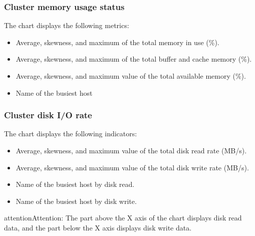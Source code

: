 \documentclass[letterpaper,10pt,english]{sphinxmanual}
\begin{document}
\subsubsection{Cluster memory usage status}
\label{\detokenize{manage-system/web-platform-monitoring/web-platform-view-cluster-status:cluster-memory-usage-status}}
\sphinxAtStartPar
The chart displays the following metrics:
\begin{itemize}
\item {} 
\sphinxAtStartPar
Average, skewness, and maximum of the total memory in use (\%).

\item {} 
\sphinxAtStartPar
Average, skewness, and maximum of the total buffer and cache memory (\%).

\item {} 
\sphinxAtStartPar
Average, skewness, and maximum value of the total available memory (\%).

\item {} 
\sphinxAtStartPar
Name of the busiest host

\end{itemize}


\subsubsection{Cluster disk I/O rate}
\label{\detokenize{manage-system/web-platform-monitoring/web-platform-view-cluster-status:cluster-disk-i-o-rate}}
\sphinxAtStartPar
The chart displays the following indicators:
\begin{itemize}
\item {} 
\sphinxAtStartPar
Average, skewness, and maximum value of the total disk read rate (MB/s).

\item {} 
\sphinxAtStartPar
Average, skewness, and maximum value of the total disk write rate (MB/s).

\item {} 
\sphinxAtStartPar
Name of the busiest host by disk read.

\item {} 
\sphinxAtStartPar
Name of the busiest host by disk write.

\end{itemize}

\begin{sphinxadmonition}{attention}{Attention:}
\sphinxAtStartPar
The part above the X axis of the chart displays disk read data, and the part below the X axis displays disk write data.
\end{sphinxadmonition}
\end{document}
